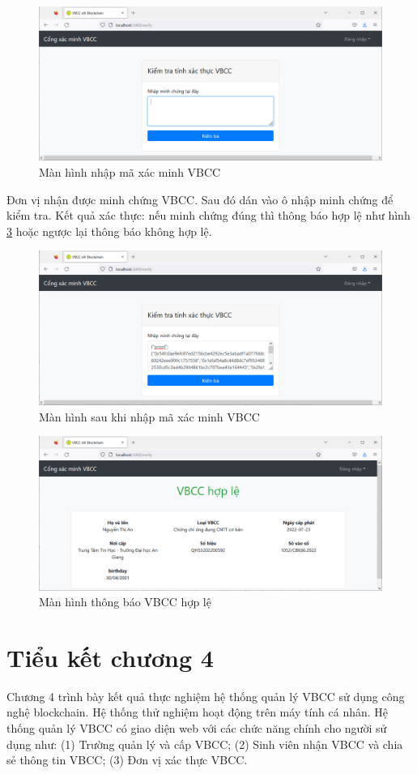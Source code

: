 \begin{figure}[H]
\centering
\includegraphics[width=.9\linewidth]{img/manhinh_donvixacminh_vbegin.PNG}
\caption{Màn hình nhập mã xác minh VBCC}
\label{fig:manhinh_donvixacminh_vbegin}
\end{figure}


Đơn vị nhận được minh chứng VBCC. 
Sau đó dán vào ô nhập minh chứng để kiểm tra.
Kết quả xác thực: nếu minh chứng đúng thì thông báo hợp lệ như hình \ref{fig:xacminh_hople} hoặc ngược lại thông báo không hợp lệ.
\begin{figure}[H]
\centering
\includegraphics[width=.9\linewidth]{img/v_begin.PNG}
\caption{Màn hình sau khi nhập mã xác minh VBCC}
\label{fig:v_begin}
\end{figure}

\begin{figure}[H]
\centering
\includegraphics[width=.9\linewidth]{img/xacminh_hople.PNG}
\caption{Màn hình thông báo VBCC hợp lệ}
\label{fig:xacminh_hople}
\end{figure}

\section{Tiểu kết chương 4}

Chương 4 trình bày kết quả thực nghiệm hệ thống quản lý VBCC sử dụng công nghệ blockchain. Hệ thống thử nghiệm hoạt động trên máy tính cá nhân. Hệ thống quản lý VBCC có giao diện web với các chức năng chính cho người sử dụng như: (1) Trường quản lý và cấp VBCC; (2) Sinh viên nhận VBCC và chia sẻ thông tin VBCC; (3) Đơn vị xác thực VBCC. 

